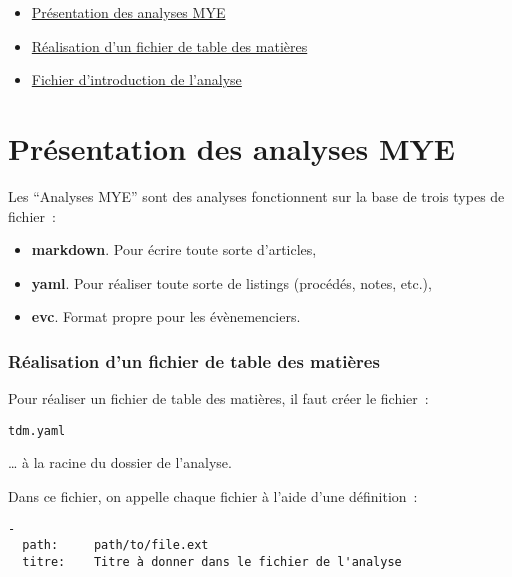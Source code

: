 \begin{itemize}
\item \href{manuel/rediger?in=analyse\&manp=analyse/analyse\_mye\#presentationdesanalysesmye}{Présentation des analyses MYE}
\item \href{manuel/rediger?in=analyse\&manp=analyse/analyse\_mye\#realisationfichiertdm}{Réalisation d'un fichier de table des matières}
\item \href{manuel/rediger?in=analyse\&manp=analyse/analyse\_mye\#fichierintroductionauto}{Fichier d'introduction de l'analyse}
\end{itemize}



\section{Présentation des analyses MYE}\hypertarget{prsentation-des-analyses-mye}{}\label{prsentation-des-analyses-mye}

Les “Analyses MYE” sont des analyses fonctionnent sur la base de trois types de fichier~{}:

\begin{itemize}
\item \textbf{markdown}. Pour écrire toute sorte d'articles,
\item \textbf{yaml}. Pour réaliser toute sorte de listings (procédés, notes, etc.),
\item \textbf{evc}. Format propre pour les évènemenciers.
\end{itemize}



\subsubsection{Réalisation d'un fichier de table des matières}\hypertarget{ralisation-dun-fichier-de-table-des-matires}{}\label{ralisation-dun-fichier-de-table-des-matires}

Pour réaliser un fichier de table des matières, il faut créer le fichier~{}:

\begin{verbatim}tdm.yaml
\end{verbatim}

… à la racine du dossier de l'analyse.

Dans ce fichier, on appelle chaque fichier à l'aide d'une définition~{}:

\begin{verbatim}-
  path:     path/to/file.ext
  titre:    Titre à donner dans le fichier de l'analyse
\end{verbatim}

